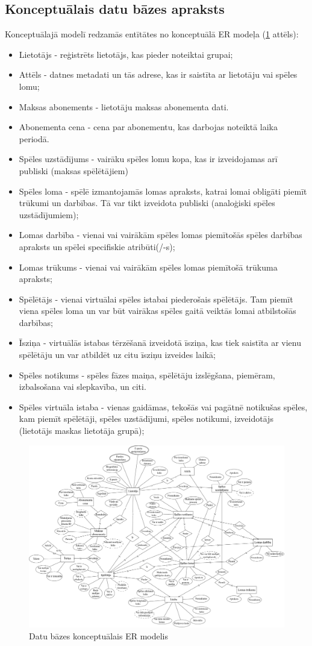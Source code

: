 \subsection{Konceptuālais datu bāzes apraksts}
Konceptuālajā modelī redzamās entītātes no konceptuālā ER modeļa (\ref{fig:conceptual-model} attēls):
\begin{itemize}
	\item Lietotājs - reģistrēts lietotājs, kas pieder noteiktai grupai;
	\item Attēls - datnes metadati un tās adrese, kas ir saistīta ar lietotāju vai spēles lomu;
	\item Maksas abonements - lietotāju maksas abonementa dati.
	\item Abonementa cena - cena par abonementu, kas darbojas noteiktā laika periodā.
	\item Spēles uzstādījums - vairāku spēles lomu kopa, kas ir izveidojamas arī publiski (maksas spēlētājiem)
	\item Spēles loma - spēlē izmantojamās lomas apraksts, katrai lomai obligāti piemīt trūkumi un darbības.
	      Tā var tikt izveidota publiski (analoģiski spēles uzstādījumiem);
	\item Lomas darbība - vienai vai vairākām spēles lomas piemītošās spēles darbības apraksts un spēlei specifiskie atribūti(/-s);
	\item Lomas trūkums - vienai vai vairākām spēles lomas piemītošā trūkuma apraksts;
	\item Spēlētājs - vienai virtuālai spēles istabai piederošais spēlētājs.
	      Tam piemīt viena spēles loma un var būt vairākas spēles gaitā veiktās
	      lomai atbilstošās darbības;
	\item Īsziņa - virtuālās istabas tērzēšanā izveidotā īsziņa, kas tiek saistīta ar vienu spēlētāju un var atbildēt uz citu īsziņu izveides laikā;
	\item Spēles notikums - spēles fāzes maiņa, spēlētāju izslēgšana, piemēram, izbalsošana vai slepkavība, un citi.
	\item Spēles virtuāla istaba - vienas gaidāmas, tekošās vai pagātnē notikušas spēles, kam piemīt spēlētāji, spēles uzstādījumi, spēles notikumi, izveidotājs (lietotājs maskas lietotāja grupā);
\end{itemize}

\begin{figure}[htbp]
	\centering
	\includegraphics[width=\linewidth]{./src/img/KonceptualaisERModelis.png}
	\caption{Datu bāzes konceptuālais ER modelis}
	\label{fig:conceptual-model}
\end{figure}

